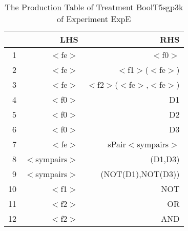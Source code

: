 \begin{table}[ht]
\centering
\begin{tabular}{rrr}
  \hline
 & LHS & RHS \\ 
  \hline
1 & $<$fe$>$ & $<$f0$>$ \\ 
  2 & $<$fe$>$ & $<$f1$>$($<$fe$>$) \\ 
  3 & $<$fe$>$ & $<$f2$>$($<$fe$>$,$<$fe$>$) \\ 
  4 & $<$f0$>$ & D1 \\ 
  5 & $<$f0$>$ & D2 \\ 
  6 & $<$f0$>$ & D3 \\ 
  7 & $<$fe$>$ & sPair$<$sympairs$>$ \\ 
  8 & $<$sympairs$>$ & (D1,D3) \\ 
  9 & $<$sympairs$>$ & (NOT(D1),NOT(D3)) \\ 
  10 & $<$f1$>$ & NOT \\ 
  11 & $<$f2$>$ & OR \\ 
  12 & $<$f2$>$ & AND \\ 
   \hline
\end{tabular}
\caption{The Production Table of Treatment BoolT5sgp3k of Experiment ExpE} 
\end{table}
